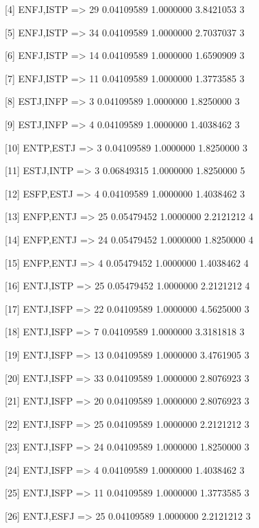 [4]   {ENFJ,ISTP}           => {29} 0.04109589 1.0000000  3.8421053  3   

[5]   {ENFJ,ISTP}           => {34} 0.04109589 1.0000000  2.7037037  3   

[6]   {ENFJ,ISTP}           => {14} 0.04109589 1.0000000  1.6590909  3   

[7]   {ENFJ,ISTP}           => {11} 0.04109589 1.0000000  1.3773585  3   

[8]   {ESTJ,INFP}           => {3}  0.04109589 1.0000000  1.8250000  3   

[9]   {ESTJ,INFP}           => {4}  0.04109589 1.0000000  1.4038462  3   

[10]  {ENTP,ESTJ}           => {3}  0.04109589 1.0000000  1.8250000  3   

[11]  {ESTJ,INTP}           => {3}  0.06849315 1.0000000  1.8250000  5   

[12]  {ESFP,ESTJ}           => {4}  0.04109589 1.0000000  1.4038462  3   

[13]  {ENFP,ENTJ}           => {25} 0.05479452 1.0000000  2.2121212  4   

[14]  {ENFP,ENTJ}           => {24} 0.05479452 1.0000000  1.8250000  4   

[15]  {ENFP,ENTJ}           => {4}  0.05479452 1.0000000  1.4038462  4   

[16]  {ENTJ,ISTP}           => {25} 0.05479452 1.0000000  2.2121212  4   

[17]  {ENTJ,ISFP}           => {22} 0.04109589 1.0000000  4.5625000  3   

[18]  {ENTJ,ISFP}           => {7}  0.04109589 1.0000000  3.3181818  3   

[19]  {ENTJ,ISFP}           => {13} 0.04109589 1.0000000  3.4761905  3   

[20]  {ENTJ,ISFP}           => {33} 0.04109589 1.0000000  2.8076923  3   

[21]  {ENTJ,ISFP}           => {20} 0.04109589 1.0000000  2.8076923  3   

[22]  {ENTJ,ISFP}           => {25} 0.04109589 1.0000000  2.2121212  3   

[23]  {ENTJ,ISFP}           => {24} 0.04109589 1.0000000  1.8250000  3   

[24]  {ENTJ,ISFP}           => {4}  0.04109589 1.0000000  1.4038462  3   

[25]  {ENTJ,ISFP}           => {11} 0.04109589 1.0000000  1.3773585  3   

[26]  {ENTJ,ESFJ}           => {25} 0.04109589 1.0000000  2.2121212  3   

